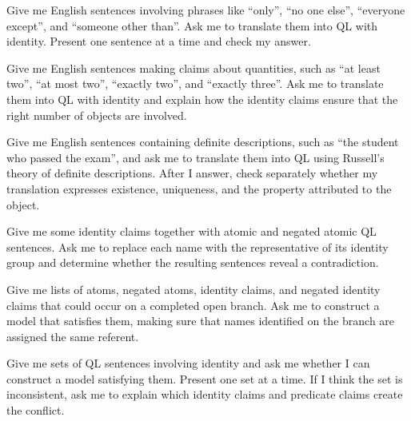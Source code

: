 \begin{genaipractice}[]
\item Give me English sentences involving phrases like ``only'', ``no one else'', ``everyone except'', and ``someone other than''. Ask me to translate them into QL with identity. Present one sentence at a time and check my answer.

\item Give me English sentences making claims about quantities, such as ``at least two'', ``at most two'', ``exactly two'', and ``exactly three''. Ask me to translate them into QL with identity and explain how the identity claims ensure that the right number of objects are involved.

\item Give me English sentences containing definite descriptions, such as ``the student who passed the exam'', and ask me to translate them into QL using Russell's theory of definite descriptions. After I answer, check separately whether my translation expresses existence, uniqueness, and the property attributed to the object.

\item Give me some identity claims together with atomic and negated atomic QL sentences. Ask me to replace each name with the representative of its identity group and determine whether the resulting sentences reveal a contradiction.

\item Give me lists of atoms, negated atoms, identity claims, and negated identity claims that could occur on a completed open branch. Ask me to construct a model that satisfies them, making sure that names identified on the branch are assigned the same referent.

\item Give me sets of QL sentences involving identity and ask me whether I can construct a model satisfying them. Present one set at a time. If I think the set is inconsistent, ask me to explain which identity claims and predicate claims create the conflict.

\end{genaipractice}
